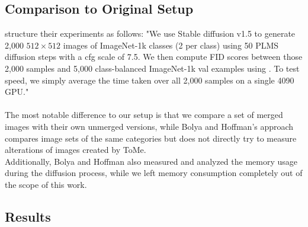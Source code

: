 \subsection{Comparison to Original Setup}
\cite{bolya2023tomesd} structure their experiments as follows: "We use Stable diffusion v1.5 to generate 2,000 $512 \times 512$ images of ImageNet-1k \cite{deng2009imagenet} classes (2 per class) using 50 PLMS \cite{liu2022pseudo} diffusion steps with a cfg scale \cite{dhariwal2021diffusion} of 7.5. We then compute FID scores between those 2,000 samples and 5,000 class-balanced ImageNet-1k val examples using \cite{Seitzer2020FID}. To test speed, we simply average the time taken over all 2,000 samples on a single 4090 GPU."\\
\\
The most notable difference to our setup is that we compare a set of merged images with their own unmerged versions, while Bolya and Hoffman's approach compares image sets of the same categories but does not directly try to measure alterations of images created by ToMe.\\
Additionally, Bolya and Hoffman also measured and analyzed the memory usage during the diffusion process, while we left memory consumption completely out of the scope of this work.



\subsection{Results}




\newpage
